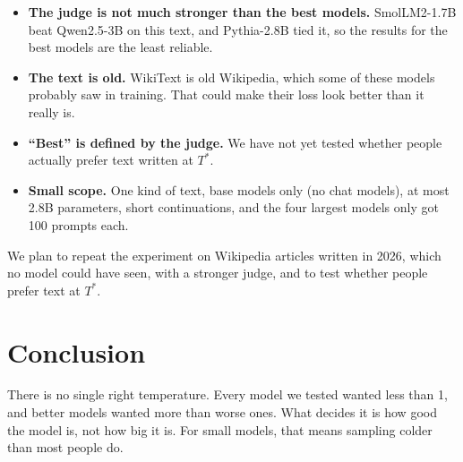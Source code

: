 \documentclass[10pt]{article}
\begin{document}
\begin{itemize}
    \item \textbf{The judge is not much stronger than the best models.} SmolLM2-1.7B beat Qwen2.5-3B on this text, and Pythia-2.8B tied it, so the results for the best models are the least reliable.
    \item \textbf{The text is old.} WikiText is old Wikipedia, which some of these models probably saw in training. That could make their loss look better than it really is.
    \item \textbf{``Best'' is defined by the judge.} We have not yet tested whether people actually prefer text written at $T^*$.
    \item \textbf{Small scope.} One kind of text, base models only (no chat models), at most 2.8B parameters, short continuations, and the four largest models only got 100 prompts each.
\end{itemize}

We plan to repeat the experiment on Wikipedia articles written in 2026, which no model could have seen, with a stronger judge, and to test whether people prefer text at $T^*$.

\section{Conclusion}

There is no single right temperature. Every model we tested wanted less than 1, and better models wanted more than worse ones. What decides it is how good the model is, not how big it is. For small models, that means sampling colder than most people do.



\end{document}
